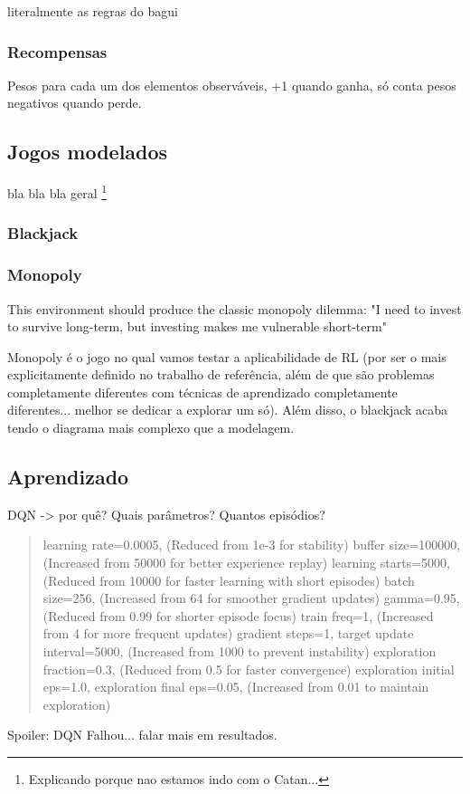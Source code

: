 \documentclass[conference]{IEEEtran}
\begin{document}
literalmente as regras do bagui

\subsubsection{Recompensas}

Pesos para cada um dos elementos observáveis, +1 quando ganha, só conta pesos negativos quando perde.

\subsection{Jogos modelados}
bla bla bla geral \footnote{Explicando porque nao estamos indo com o Catan...}
\subsubsection{Blackjack}
\subsubsection{Monopoly}
This environment should produce the classic monopoly dilemma: "I need to invest to survive long-term, but investing makes me vulnerable short-term"


Monopoly é o jogo no qual vamos testar a aplicabilidade de RL (por ser o mais explicitamente definido no trabalho de referência, além de que são problemas completamente diferentes com técnicas de aprendizado completamente diferentes... melhor se dedicar a explorar um só). Além disso, o blackjack acaba tendo o diagrama mais complexo que a modelagem.

\subsection{Aprendizado}
DQN -> por quê? 
Quais parâmetros? Quantos episódios?
\begin{quote}
    \small
    \color{blue}
    learning rate=0.0005,            (Reduced from 1e-3 for stability)
    buffer size=100000,              (Increased from 50000 for better experience replay)
    learning starts=5000,            (Reduced from 10000 for faster learning with short episodes)
    batch size=256,                  (Increased from 64 for smoother gradient updates)
    gamma=0.95,                      (Reduced from 0.99 for shorter episode focus)
    train freq=1,                    (Increased from 4 for more frequent updates)
    gradient steps=1,
    target update interval=5000,     (Increased from 1000 to prevent instability)
    exploration fraction=0.3,        (Reduced from 0.5 for faster convergence)
    exploration initial eps=1.0,
    exploration final eps=0.05,      (Increased from 0.01 to maintain exploration)
\end{quote}
Spoiler: DQN Falhou... falar mais em resultados.
\end{document}
